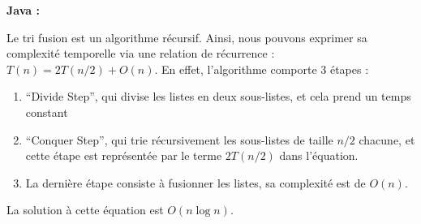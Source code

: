 \begin{Exercice} [20 minutes]
     \begin{solution}
        \textbf{Java :}
        
    \end{solution}
    \begin{solution}
        
    \end{solution}
    \begin{solution}
        
        Le tri fusion est un algorithme récursif. Ainsi, nous pouvons exprimer sa complexité temporelle via une relation de récurrence : $T(n) = 2T(n/2) + O(n)$. En effet, l'algorithme comporte 3 étapes :
        \begin{enumerate}
            \item ``Divide Step'', qui divise les listes en deux sous-listes, et cela prend un temps constant
            \item ``Conquer Step'', qui trie récursivement les sous-listes de taille $n/2$ chacune, et cette étape est représentée par le terme $2T(n/2)$ dans l'équation.
            \item La dernière étape consiste à fusionner les listes, sa complexité est de $O(n)$.
        \end{enumerate}
        La solution à cette équation est $O(n \log n)$.
    \end{solution}
\end{Exercice}





